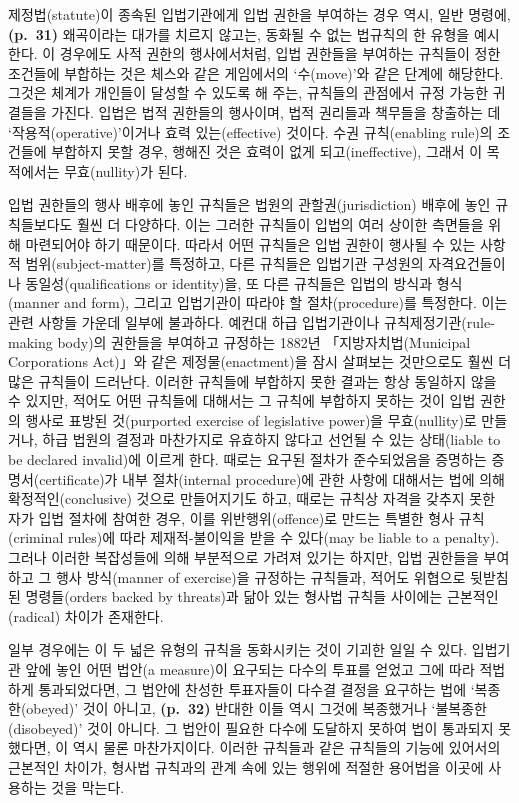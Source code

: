 제정법(statute)이 종속된 입법기관에게 입법 권한을 부여하는 경우 역시,
일반 명령에, \textbf{(p.~31)} 왜곡이라는 대가를 치르지 않고는, 동화될 수
없는 법규칙의 한 유형을 예시한다. 이 경우에도 사적 권한의 행사에서처럼,
입법 권한들을 부여하는 규칙들이 정한 조건들에 부합하는 것은 체스와 같은
게임에서의 ‘수(move)’와 같은 단계에 해당한다. 그것은 체계가 개인들이
달성할 수 있도록 해 주는, 규칙들의 관점에서 규정 가능한 귀결들을 가진다.
입법은 법적 권한들의 행사이며, 법적 권리들과 책무들을 창출하는 데
‘작용적(operative)’이거나 효력 있는(effective) 것이다. 수권
규칙(enabling rule)의 조건들에 부합하지 못할 경우, 행해진 것은 효력이
없게 되고(ineffective), 그래서 이 목적에서는 무효(nullity)가 된다.

입법 권한들의 행사 배후에 놓인 규칙들은 법원의 관할권(jurisdiction)
배후에 놓인 규칙들보다도 훨씬 더 다양하다. 이는 그러한 규칙들이 입법의
여러 상이한 측면들을 위해 마련되어야 하기 때문이다. 따라서 어떤 규칙들은
입법 권한이 행사될 수 있는 사항적 범위(subject-matter)를 특정하고, 다른
규칙들은 입법기관 구성원의 자격요건들이나 동일성(qualifications or
identity)을, 또 다른 규칙들은 입법의 방식과 형식(manner and form),
그리고 입법기관이 따라야 할 절차(procedure)를 특정한다. 이는 관련 사항들
가운데 일부에 불과하다. 예컨대 하급 입법기관이나
규칙제정기관(rule-making body)의 권한들을 부여하고 규정하는 1882년
「지방자치법(Municipal Corporations Act)」와 같은 제정물(enactment)을
잠시 살펴보는 것만으로도 훨씬 더 많은 규칙들이 드러난다. 이러한 규칙들에
부합하지 못한 결과는 항상 동일하지 않을 수 있지만, 적어도 어떤 규칙들에
대해서는 그 규칙에 부합하지 못하는 것이 입법 권한의 행사로 표방된
것(purported exercise of legislative power)을 무효(nullity)로 만들거나,
하급 법원의 결정과 마찬가지로 유효하지 않다고 선언될 수 있는 상태(liable
to be declared invalid)에 이르게 한다. 때로는 요구된 절차가 준수되었음을
증명하는 증명서(certificate)가 내부 절차(internal procedure)에 관한
사항에 대해서는 법에 의해 확정적인(conclusive) 것으로 만들어지기도 하고,
때로는 규칙상 자격을 갖추지 못한 자가 입법 절차에 참여한 경우, 이를
위반행위(offence)로 만드는 특별한 형사 규칙(criminal rules)에 따라
제재적-불이익을 받을 수 있다(may be liable to a penalty). 그러나 이러한
복잡성들에 의해 부분적으로 가려져 있기는 하지만, 입법 권한들을 부여하고
그 행사 방식(manner of exercise)을 규정하는 규칙들과, 적어도 위협으로
뒷받침된 명령들(orders backed by threats)과 닮아 있는 형사법 규칙들
사이에는 근본적인(radical) 차이가 존재한다.

일부 경우에는 이 두 넓은 유형의 규칙을 동화시키는 것이 기괴한 일일 수
있다. 입법기관 앞에 놓인 어떤 법안(a measure)이 요구되는 다수의 투표를
얻었고 그에 따라 적법하게 통과되었다면, 그 법안에 찬성한 투표자들이
다수결 결정을 요구하는 법에 ‘복종한(obeyed)’ 것이 아니고,
\textbf{(p.~32)} 반대한 이들 역시 그것에 복종했거나
‘불복종한(disobeyed)’ 것이 아니다. 그 법안이 필요한 다수에 도달하지
못하여 법이 통과되지 못했다면, 이 역시 물론 마찬가지이다. 이러한
규칙들과 같은 규칙들의 기능에 있어서의 근본적인 차이가, 형사법 규칙과의
관계 속에 있는 행위에 적절한 용어법을 이곳에 사용하는 것을 막는다.

